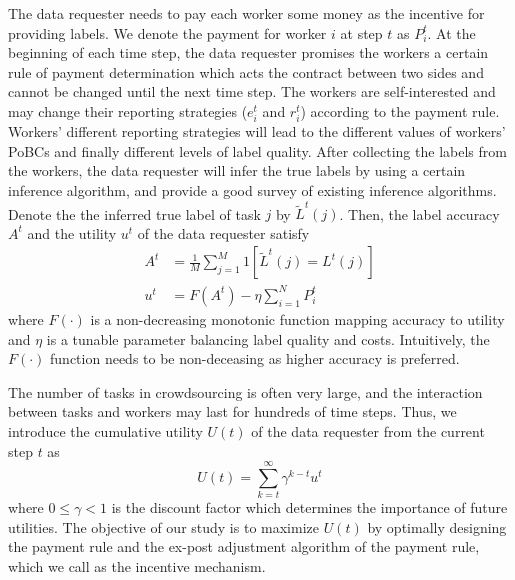 The data requester needs to pay each worker some money as the incentive for providing labels.
We denote the payment for worker $i$ at step $t$ as $P^{t}_{i}$.
At the beginning of each time step, the data requester promises the workers a certain rule of payment determination which acts the contract between two sides and cannot be changed until the next time step.
The workers are self-interested and may change their reporting strategies ($e^t_i$ and $r^t_i$) according to the payment rule.
Workers' different reporting strategies will lead to the different values of workers' PoBCs and finally different levels of label quality.
After collecting the labels from the workers, the data requester will infer the true labels by using a certain inference algorithm, and \cite{zheng2017truth} provide a good survey of existing inference algorithms.
Denote the the inferred true label of task $j$ by $\tilde{L}^{t}(j)$.
Then, the label accuracy $A^t$ and the utility $u^t$ of the data requester satisfy
\begin{equation}
\label{equqation:utility}
\begin{split}
A^t&=\frac{1}{M}{\sum}_{j=1}^{M}1\left[\tilde{L}^{t}(j)=L^{t}(j)\right]\\
u^t &= F(A^t) - \eta {\sum}_{i=1}^{N}P^t_i
\end{split}
\end{equation}
where $F(\cdot)$ is a non-decreasing monotonic function mapping accuracy to utility and $\eta$ is a
tunable parameter balancing label quality and costs. Intuitively, the $F(\cdot)$ function needs to be non-deceasing as higher accuracy is preferred.

The number of tasks in crowdsourcing is often very large, and the interaction between tasks and workers may last for hundreds of time steps.
Thus, we introduce the cumulative utility $U(t)$ of the data requester from the current step $t$ as
\begin{equation}
U(t)={\sum}_{k=t}^{\infty}\gamma^{k-t}u^t
\end{equation}
where $0\leq \gamma< 1$ is the discount factor which determines the importance of future utilities.
The objective of our study is to maximize $U(t)$ by optimally designing the payment rule and the ex-post adjustment algorithm of the payment rule, which we call as the incentive mechanism.